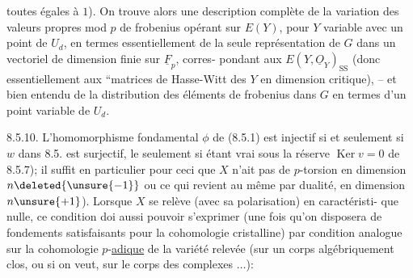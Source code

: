 toutes égales à $1$). On trouve alors une description complète de la
variation des valeurs propres mod $p$ de frobenius opérant sur $E(Y)$, pour
$Y$ variable avec un point de $U_d$, en termes essentiellement de la seule
représentation de $G$ dans un vectoriel de dimension finie sur $\underline F_p$, corres-
pondant aux $E(Y,\underline O_Y)_{\mathrm{SS}}$ (donc essentiellement aux ``matrices de Hasse-Witt
des $Y$ en dimension critique), -- et bien entendu de la distribution des
 éléments de frobenius dans $G$ en termes d'un point variable de
$U_d$.

8.5.10. L'homomorphisme fondamental $\phi$ de (8.5.1) est 
 injectif\deleted{)}  si et seulement si $w$ dans 8.5. est 
 surjectif,  le seulement si étant vrai sous la réserve
$\operatorname{Ker}v=0$ de 8.5.7); il suffit en particulier pour ceci que $X$ n'ait pas
de $p$-torsion en  dimension $n\deleted{\unsure{-1}}$  ou ce qui revient au même par dualité, en dimension $n\unsure{+1}$). Lorsque $X$
se  relève (avec sa polarisation) en caractéristi-
que nulle, ce condition  doi aussi pouvoir s'exprimer (une
fois qu'on disposera de fondements satisfaisants pour la cohomologie
cristalline) par  condition analogue sur la  cohomologie $p$-\uline{adique}
de la variété relevée (sur un corps algébriquement clos, ou si on veut,
sur le corps des complexes $\ldots$): 


